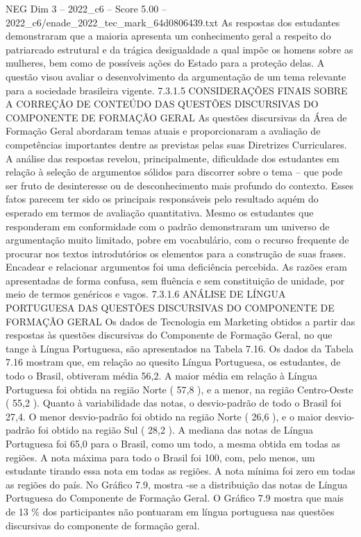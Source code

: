 \begin{textsample}{NEG Dim 3 – 2022\_c6 – Score 5.00 – 2022\_c6/enade\_2022\_tec\_mark\_64d0806439.txt}
As respostas dos estudantes demonstraram que a maioria apresenta um conhecimento geral a respeito do patriarcado estrutural e da trágica desigualdade a qual impõe os homens sobre as mulheres, bem como de possíveis ações do Estado para a proteção delas.
A questão visou avaliar o desenvolvimento da argumentação de um tema relevante para a sociedade brasileira vigente. 7.3.1.5 CONSIDERAÇÕES FINAIS SOBRE A CORREÇÃO DE CONTEÚDO DAS QUESTÕES DISCURSIVAS DO COMPONENTE DE FORMAÇÃO GERAL As questões discursivas da Área de Formação Geral abordaram temas atuais e proporcionaram a avaliação de competências importantes dentre as previstas pelas suas Diretrizes Curriculares.
A análise das respostas revelou, principalmente, dificuldade dos estudantes em relação à seleção de argumentos sólidos para discorrer sobre o tema – que pode ser fruto de desinteresse ou de desconhecimento mais profundo do contexto.
Esses fatos parecem ter sido os principais responsáveis pelo resultado aquém do esperado em termos de avaliação quantitativa.
Mesmo os estudantes que responderam em conformidade com o padrão demonstraram um universo de argumentação muito limitado, pobre em vocabulário, com o recurso frequente de procurar nos textos introdutórios os elementos para a construção de suas frases.
Encadear e relacionar argumentos foi uma deficiência percebida.
As razões eram apresentadas de forma confusa, sem fluência e sem constituição de unidade, por meio de termos genéricos e vagos. 7.3.1.6 ANÁLISE DE LÍNGUA PORTUGUESA DAS QUESTÕES DISCURSIVAS DO COMPONENTE DE FORMAÇÃO GERAL Os dados de Tecnologia em Marketing obtidos a partir das respostas às questões discursivas do Componente de Formação Geral, no que tange à Língua Portuguesa, são apresentados na Tabela 7.16.
Os dados da Tabela 7.16 mostram que, em relação ao quesito Língua Portuguesa, os estudantes, de todo o Brasil, obtiveram média 56,2.
A maior média em relação à Língua Portuguesa foi obtida na região Norte ( 57,8 ), e a menor, na região Centro-Oeste ( 55,2 ).
Quanto à variabilidade das notas, o desvio-padrão de todo o Brasil foi 27,4.
O menor desvio-padrão foi obtido na região Norte ( 26,6 ), e o maior desvio-padrão foi obtido na região Sul ( 28,2 ).
A mediana das notas de Língua Portuguesa foi 65,0 para o Brasil, como um todo, a mesma obtida em todas as regiões.
A nota máxima para todo o Brasil foi 100, com, pelo menos, um estudante tirando essa nota em todas as regiões.
A nota mínima foi zero em todas as regiões do país.
No Gráfico 7.9, mostra -se a distribuição das notas de Língua Portuguesa do Componente de Formação Geral.
O Gráfico 7.9 mostra que mais de 13 \% dos participantes não pontuaram em língua portuguesa nas questões discursivas do componente de formação geral.

\end{textsample}
